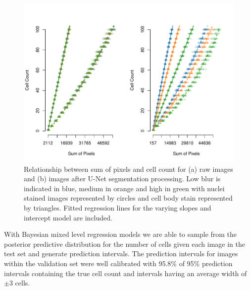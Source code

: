 \documentclass[isoft]{poster_class_UofC}
\begin{document}
\begin{poster}
           \begin{figure}
            \centering
            \captionsetup{type=figure}
            \includegraphics[scale=1.2]{./images/RawVUnet.pdf}
            \caption{Relationship between sum of pixels and cell count for (a) raw images and (b) images after U-Net segmentation processing. Low blur is indicated in blue, medium in orange and high in green with nuclei stained images represented by circles and cell body stain represented by triangles. Fitted regression lines for the varying slopes and intercept model are included.}
            \label{fig:Results}
        \end{figure}   
            \vspace{1cm}
With Bayesian mixed level regression models we are able to sample from the posterior predictive distribution for the number of cells given each image in the test set and generate prediction intervals. The prediction intervals for images within the validation set were well calibrated with 95.8\% of 95\% prediction intervals containing the true cell count and intervals having an average width of $\pm 3$ cells.


\end{poster}
\end{document}
